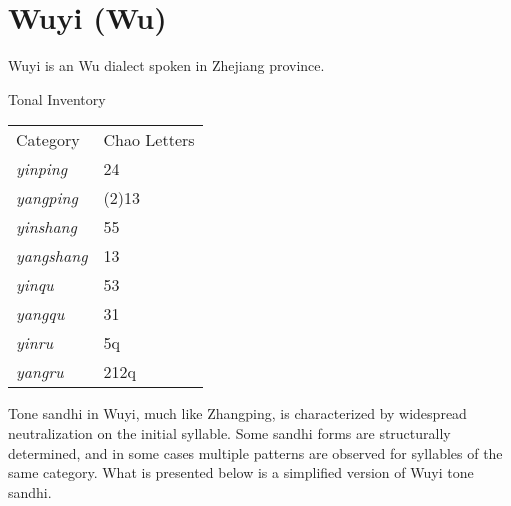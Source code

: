 \documentclass{article}
\begin{document}
\section{Wuyi (Wu)}
Wuyi is an Wu dialect spoken in Zhejiang province. \cite{Fu1984}
\begin{exe}
\ex Tonal Inventory \\
\begin{tabular}[t]{|ll|}
\hline
Category & Chao Letters \\
\textit{yinping} & 24 \\
\textit{yangping} & (2)13 \\
\textit{yinshang} & 55 \\
\textit{yangshang} & 13 \\
\textit{yinqu} & 53 \\
\textit{yangqu} & 31 \\
\textit{yinru} & 5q \\
\textit{yangru} & 212q \\
\hline
\end{tabular}
\end{exe}
Tone sandhi in Wuyi, much like Zhangping, is characterized by widespread neutralization on the initial syllable. Some sandhi forms are structurally determined, and in some cases multiple patterns are observed for syllables of the same category. What is presented below is a simplified version of Wuyi tone sandhi.
\end{document}
